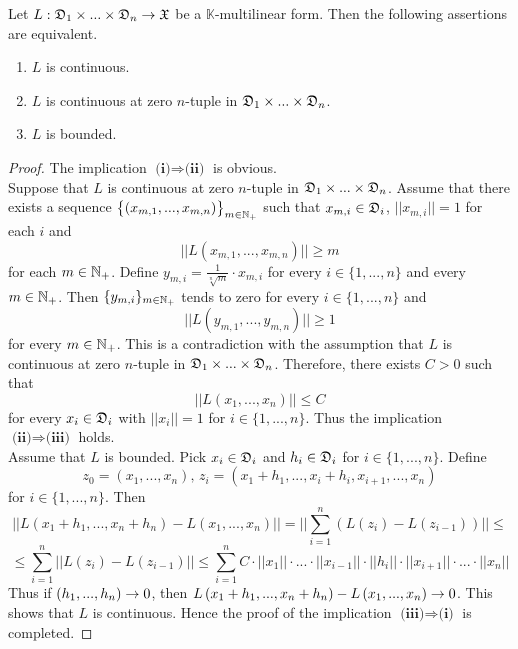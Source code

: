 \begin{theorem}\label{theorem:characterization_of_bounded_multilinear_maps}
Let $L:{\mathfrak D}_1\times ... \times {\mathfrak D}_n\rightarrow {\mathfrak X}$ be a $\mathbb{K}$-multilinear form. Then the following assertions are equivalent.
\begin{enumerate}[label=\emph{\textbf{(\roman*)}}, leftmargin=*]
\item $L$ is continuous.
\item $L$ is continuous at zero $n$-tuple in ${\mathfrak D}_1\times ... \times {\mathfrak D}_n$.
\item $L$ is bounded.
\end{enumerate}
\end{theorem}
\begin{proof}
The implication $\textbf{(i)}\Rightarrow \textbf{(ii)}$ is obvious.\\
Suppose that $L$ is continuous at zero $n$-tuple in ${\mathfrak D}_1\times ... \times {\mathfrak D}_n$. Assume that there exists a sequence $\big\{(x_{m,1},...,x_{m,n})\big\}_{m\in {\mathbb N}_+}$ such that $x_{m,i} \in {\mathfrak D}_i$, $||x_{m,i}||=1$ for each $i$ and
$$||L(x_{m,1},...,x_{m,n})|| \geq m$$
for each $m\in {\mathbb N}_+$. Define $y_{m,i} = \frac{1}{\sqrt[n]{m}}\cdot x_{m,i}$ for every $i\in \{1,...,n\}$ and every $m\in {\mathbb N}_+$. Then $\{y_{m,i}\}_{m\in {\mathbb N}_+}$ tends to zero for every $i\in \{1,...,n\}$ and
$$||L(y_{m,1},...,y_{m,n})|| \geq 1$$
for every $m\in {\mathbb N}_+$. This is a contradiction with the assumption that $L$ is continuous at zero $n$-tuple in ${\mathfrak D}_1\times ... \times {\mathfrak D}_n$. Therefore, there exists $C > 0$ such that
$$||L(x_1,...,x_n)|| \leq C$$
for every $x_i \in {\mathfrak D}_i$ with $||x_i|| = 1$ for $i\in \{1,...,n\}$. Thus the implication $\textbf{(ii)}\Rightarrow \textbf{(iii)}$ holds.\\
Assume that $L$ is bounded. Pick $x_i \in {\mathfrak D}_i$ and $h_i\in {\mathfrak D}_i$ for $i\in \{1,...,n\}$. Define
$$z_0  = (x_1,...,x_n),\,z_i = (x_1+h_1,...,x_i+h_i,x_{i+1},...,x_n)$$
for $i\in \{1,...,n\}$. Then
$$\big|\big|L\left(x_1+h_1,...,x_n+h_n\right) - L\left(x_1,...,x_n\right)\big|\big| = \bigg|\bigg|\sum_{i=1}^n\left(L(z_{i}) - L(z_{i-1})\right)\bigg|\bigg| \leq $$
$$\leq\sum_{i=1}^n\big|\big|L(z_{i}) - L(z_{i-1})\big|\big| \leq \sum_{i=1}^nC\cdot ||x_1||\cdot ...\cdot ||x_{i-1}||\cdot ||h_i||\cdot ||x_{i+1}||\cdot ... \cdot ||x_n||$$
Thus if $(h_1,...,h_n)\rightarrow 0$, then $L\left(x_1+h_1,...,x_n+h_n\right) - L\left(x_1,...,x_n\right) \rightarrow 0$. This shows that $L$ is continuous. Hence the proof of the implication $\textbf{(iii)}\Rightarrow \textbf{(i)}$ is completed.
\end{proof}

